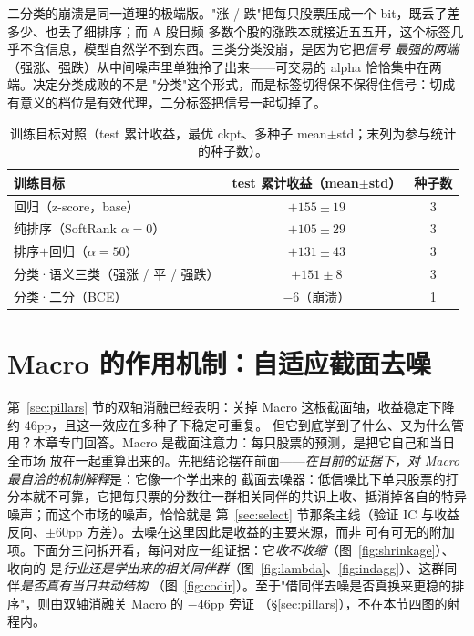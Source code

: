 \documentclass[a4paper,11pt,fontset=fandol]{ctexart}
\begin{document}
二分类的崩溃是同一道理的极端版。"涨 / 跌"把每只股票压成一个 bit，既丢了差多少、也丢了细排序；而 A 股日频
多数个股的涨跌本就接近五五开，这个标签几乎不含信息，模型自然学不到东西。三类分类没崩，是因为它把\emph{信号
最强的两端}（强涨、强跌）从中间噪声里单独拎了出来——可交易的 alpha 恰恰集中在两端。决定分类成败的不是
"分类"这个形式，而是标签切得保不保得住信号：切成有意义的档位是有效代理，二分标签把信号一起切掉了。

\begin{table}[H]
\centering
\caption{训练目标对照（test 累计收益，最优 ckpt、多种子 mean$\pm$std；末列为参与统计的种子数）。}
\label{tab:objective}
\begin{tabular}{lcc}
\toprule
训练目标 & test 累计收益（mean$\pm$std） & 种子数 \\
\midrule
回归（z-score，base） & $+155\pm19$ & 3 \\
纯排序（SoftRank $\alpha{=}0$） & $+105\pm29$ & 3 \\
排序$+$回归（$\alpha{=}50$） & $+131\pm43$ & 3 \\
分类·语义三类（强涨 / 平 / 强跌） & $+151\pm8$ & 3 \\
分类·二分（BCE） & $-6$（崩溃） & 1 \\
\bottomrule
\end{tabular}
\end{table}


\section{Macro 的作用机制：自适应截面去噪}\label{sec:macro}
第~\ref{sec:pillars} 节的双轴消融已经表明：关掉 Macro 这根截面轴，收益稳定下降约 $46$pp，且这一效应在多种子下稳定可重复。
但它到底学到了什么、又为什么管用？本章专门回答。Macro 是截面注意力：每只股票的预测，是把它自己和当日全市场
放在一起重算出来的。先把结论摆在前面——\emph{在目前的证据下，对 Macro 最自洽的机制解释}是：它像一个学出来的
截面去噪器：低信噪比下单只股票的打分本就不可靠，它把每只票的分数往一群相关同伴的共识上收、抵消掉各自的特异
噪声；而这个市场的噪声，恰恰就是
第~\ref{sec:select} 节那条主线（验证 IC 与收益反向、$\pm60$pp 方差）。去噪在这里因此是收益的主要来源，而非
可有可无的附加项。下面分三问拆开看，每问对应一组证据：它\emph{收不收缩}（图~\ref{fig:shrinkage}）、收向的
是\emph{行业还是学出来的相关同伴群}（图~\ref{fig:lambda}、\ref{fig:indagg}）、这群同伴\emph{是否真有当日共动结构}
（图~\ref{fig:codir}）。至于"借同伴去噪是否真换来更稳的排序"，则由双轴消融关 Macro 的 $-46$pp 旁证
（§\ref{sec:pillars}），不在本节四图的射程内。
\end{document}
